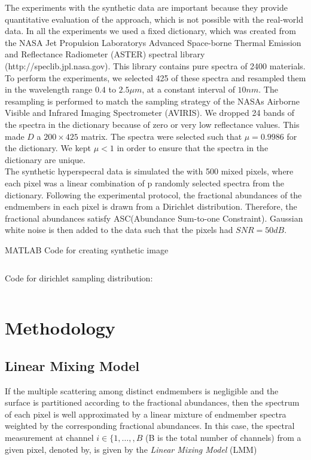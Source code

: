 \documentclass[12pt]{svproc}
\begin{document}
 The experiments with the synthetic data are important because they provide quantitative evaluation of the approach, which is not possible with the real-world data. In all the experiments we used a fixed dictionary, which was created from the NASA Jet Propulsion Laboratorys Advanced Space-borne Thermal Emission and Reflectance Radiometer (ASTER) spectral library (http://speclib.jpl.nasa.gov). This library contains pure spectra of 2400 materials.\\
 
 To perform the experiments, we selected 425 of these spectra and resampled them in the wavelength range $0.4$ to $2.5 \mu m$, at a constant interval of $10nm$. The resampling is performed to match the sampling strategy of the NASAs Airborne Visible and Infrared Imaging Spectrometer (AVIRIS). We dropped 24 bands of the spectra in the dictionary because of zero or very low reflectance values. This made $D$ a $200 \times 425$ matrix. The spectra were selected such that $\mu = 0.9986$ for the dictionary. We kept $\mu < 1$ in order to ensure that the spectra in the dictionary are unique.\\
 
 The synthetic hyperspecral data is simulated the  with 500 mixed pixels, where each pixel was a linear combination of p randomly selected spectra from the dictionary. Following the experimental protocol, the fractional abundances of the endmembers in each pixel is drawn from a Dirichlet distribution. Therefore, the fractional abundances satisfy ASC(Abundance Sum-to-one Constraint). Gaussian white noise is then added to the data such that the pixels had $SNR = 50dB$. 
 
 
 
 MATLAB Code for creating synthetic image \\
 \hline
 \inputminted{octave}{createImage.m}
 \hline
 \vspace{0.5cm}
 Code for dirichlet sampling distribution:\\
 \hline
 \inputminted{octave}{dirichletSampling.m}
\hline





\section{Methodology}
%
\subsection{Linear Mixing Model}
If the multiple scattering among distinct endmembers is negligible and the surface is partitioned according to the fractional abundances, then the spectrum of each pixel is well approximated by a linear mixture of endmember spectra weighted by the corresponding fractional abundances. In this case, the spectral measurement at channel $i \in \{1,\allowbreak\dots,\allowbreak,B$ (B is the total number of channels) from a given pixel, denoted by, is given by the \emph{Linear Mixing Model} (LMM)
\end{document}
